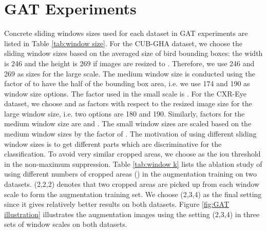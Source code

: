 \documentclass{bmvc2k}
\begin{document}
\section{GAT Experiments}
\begin{table}[h]
\centering
{}
\vspace{0.5cm}
\caption{Sliding window size used in GAT.}
\label{tab:window size}
\end{table}

Concrete sliding windows sizes  used for each dataset in GAT experiments are listed in Table \ref{tab:window size}. For the CUB-GHA dataset, we choose the sliding window sizes based on the averaged size of bird bounding boxes: the width is 246 and the height is 269 if images are resized to . Therefore, we use 246 and 269 as sizes for the large scale. The medium window size is conducted using the factor of  to have the half of the bounding box area, i.e. we use 174 and 190 as window size options. The factor used in the small scale is . For the CXR-Eye dataset, we choose  and  as factors with respect to the resized image size  for the large window size, i.e. two options are 180 and 190. Similarly, factors for the medium window size are  and . The small window sizes are scaled based on the medium window sizes by the factor of . The motivation of using different sliding window sizes is to get different parts which are discriminative for the classification. To avoid very similar cropped areas, we choose  as the iou threshold in the non-maximum suppression. Table \ref{tab:window k} lists the ablation study of using different numbers of cropped areas () in the augmentation training on two datasets. (2,2,2) denotes that two cropped areas are picked up from each window scale to form the augmentation training set. We choose (2,3,4) as the final setting since it gives relatively better results on both datasets. Figure \ref{fig:GAT illustration} illustrates the augmentation images using the setting (2,3,4) in three sets of window scales on both datasets. 
\end{document}
